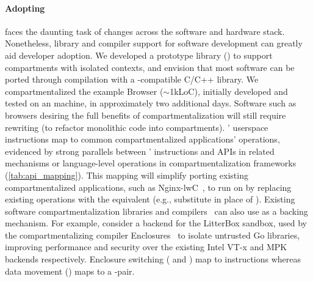 \paragraph{Adopting \seccells}
\seccells faces the daunting task of changes across the software and 
hardware stack.
Nonetheless, library and compiler support for software development
can greatly aid developer adoption.
We developed a prototype library
()
to support compartments with isolated contexts, and envision that
most software can be ported through compilation with a
\seccells-compatible C/C++ library.
We compartmentalized the example Browser ($\sim$1kLoC), 
initially developed and tested on an  machine, 
in approximately two additional days.
Software such as browsers desiring the full benefits of compartmentalization
will still require rewriting (to refactor monolithic code into compartments).
\seccells' userspace instructions map to common compartmentalized
applications' operations, evidenced by strong parallels between
\seccells' instructions and APIs in related mechanisms or 
language-level operations in compartmentalization
frameworks (\autoref{tab:api_mapping}).
This mapping will simplify porting existing compartmentalized
applications, such as Nginx-lwC~\cite{LittonVE0BD16}, to run on \seccells
by replacing existing operations with the \seccells equivalent 
(e.g., substitute \sdswitch in place of ).
Existing software compartmentalization libraries and compilers~\cite{HsuHEP16}
can also use \seccells as a backing mechanism.
%
For example, consider a \seccells backend for the LitterBox sandbox,
used by the compartmentalizing compiler Enclosures~\cite{GhosnKPLB21}
to isolate untrusted Go libraries, improving performance and security over
the existing Intel VT-x and MPK backends respectively.
Enclosure switching ( and ) map to \sdswitch
instructions whereas data movement () maps to a 
\sctfer-\screcv pair.

